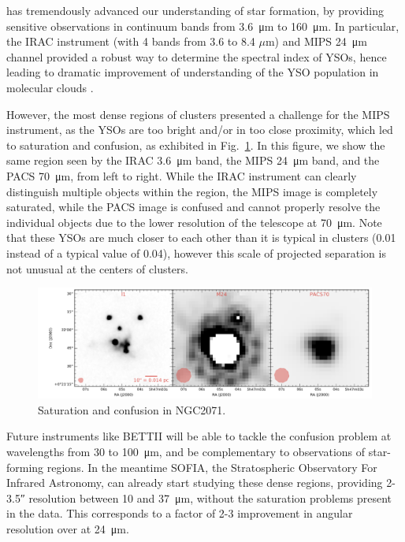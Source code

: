\Spitzer has tremendously advanced our understanding of star formation, by providing sensitive observations in continuum bands from \SI{3.6}{\um} to \SI{160}{\micro\meter}. In particular, the IRAC instrument (with 4 bands from 3.6 to 8.4 $\mu$m) and MIPS \SI{24}{\micro\meter} channel provided a robust way to determine the spectral index of YSOs, hence leading to dramatic improvement of understanding of the YSO population in molecular clouds \citep[e.g.,][]{Gutermuth:2009gca,Gutermuth:2011he}.

However, the most dense regions of clusters presented a challenge for the MIPS instrument, as the YSOs are too bright and/or in too close proximity, which led to saturation and confusion, as exhibited in Fig.~\ref{fig:NGC2071saturated}. In this figure, we show the same region seen by the IRAC \SI{3.6}{\um} band, the MIPS \SI{24}{\um} band, and the \Herschel PACS \SI{70}{\um}, from left to right. While the IRAC instrument can clearly distinguish multiple objects within the region, the MIPS image is completely saturated, while the PACS image is confused and cannot properly resolve the individual objects due to the lower resolution of the \Herschel telescope at \SI{70}{\um}. Note that these YSOs are much closer to each other than it is typical in clusters (\SI{0.01}{\pc} instead of a typical value of \SI{0.04}{\pc}), however this scale of projected separation is not unusual at the centers of clusters.

\begin{figure}[!h]
\begin{center}
\includegraphics[width=\textwidth]{Figures/NGC2071_saturated_mosaic.png}
\vspace{-0.5cm}
\caption[Saturation and confusion]{Saturation and confusion in NGC2071.}
\label{fig:NGC2071saturated}
\end{center}
\end{figure}

Future instruments like BETTII will be able to tackle the confusion problem at wavelengths from 30 to \SI{100}{\micro\meter}, and be complementary to \Herschel observations of star-forming regions. In the meantime SOFIA, the Stratospheric Observatory For Infrared Astronomy, can already start studying these dense regions, providing 2-\ang{;;3.5} resolution between 10 and \SI{37}{\micro\meter}, without the saturation problems present in the \Spitzer data. This corresponds to a factor of 2-3 improvement in angular resolution over \Spitzer at \SI{24}{\um}. 


